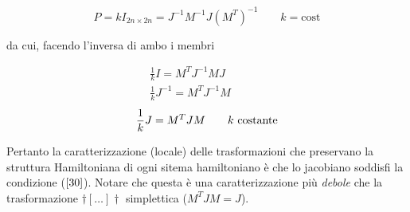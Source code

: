 \begin{equation*}
  P = k I_{2n \times 2n} = J^{-1} M^{-1} J (M^T)^{-1} \qquad k = \text{cost}
\end{equation*}

da cui, facendo l'inversa di ambo i membri

\begin{align*}
  &\frac{1}{k} I = M^T J^{-1} M J & \quad \qquad \\
  &\frac{1}{k} J^{-1} = M^T J^{-1} M & \quad \qquad 
\end{align*}
\begin{align}
  &\frac{1}{k} J = M^T J M \quad & \text{$ k $ costante} \label{30}
\end{align}

Pertanto la caratterizzazione (locale) delle trasformazioni che preservano la struttura Hamiltoniana di ogni sitema hamiltoniano è che lo jacobiano soddisfi la condizione ($ \ref{30} $). Notare che questa è una caratterizzazione più \textit{debole} che la trasformazione $ \dag [\dots] \dag $ simplettica ($ M^T J M = J $).
